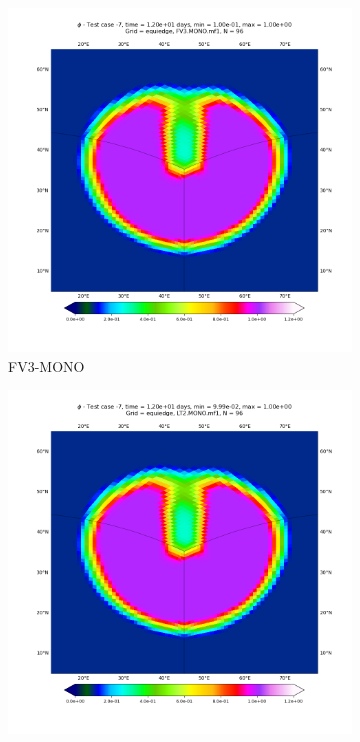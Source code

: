\documentclass[preprint,12pt]{elsarticle}
\begin{document}
\begin{linenumbers}
\begin{figure}[!htb]
	\begin{subfigure}{0.45\textwidth}
		\centering
		\includegraphics[width=1.1\linewidth]{h_tc-7_t12_alpha45_C96_g0_dg2_adv1_hord8_mf1_tf12}
		\caption{FV3-MONO\label{CY-FV3-MONO-corner}}
	\end{subfigure}
	\begin{subfigure}{0.45\textwidth}
		\centering
		\includegraphics[width=1.1\linewidth]{h_tc-7_t12_alpha45_C96_g0_dg2_adv2_hord8_mf1_tf12}

\end{subfigure}
\end{figure}
\end{linenumbers}
\end{document}
